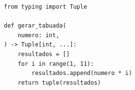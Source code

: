 \ifmostrarGabarito
\begin{verbatim}
from typing import Tuple

def gerar_tabuada(
    numero: int,
) -> Tuple[int, ...]:
    resultados = []
    for i in range(1, 11):
        resultados.append(numero * i)
    return tuple(resultados)
\end{verbatim}

\fi
